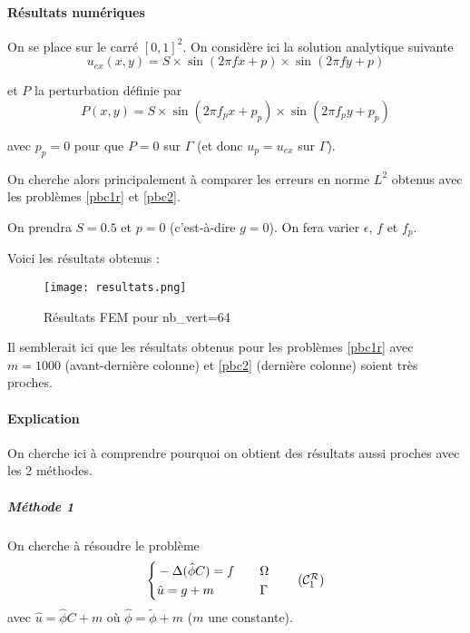 \paragraph{Résultats numériques \\} 

On se place sur le carré $[0,1]^2$. On considère ici la solution analytique suivante
$$u_{ex}(x,y) = S\times\sin(2\pi fx + p)\times\sin(2\pi fy + p)$$ 

et $P$ la perturbation définie par
$$P(x,y)=S\times\sin(2\pi f_px + p_p)\times\sin(2\pi f_py + p_p)$$

avec $p_p=0$ pour que $P=0$ sur $\Gamma$ (et donc $u_p=u_{ex}$ sur $\Gamma$). 

On cherche alors principalement à comparer les erreurs en norme $L^2$ obtenus avec les problèmes \ref{pbc1r} et \ref{pbc2}.

On prendra $S=0.5$ et $p=0$ (c'est-à-dire $g=0$). On fera varier $\epsilon$, $f$ et $f_p$. 

Voici les résultats obtenus :

\begin{minipage}{\linewidth}
	\begin{figure}[H]
		\centering
		\texttt{[image: resultats.png]}
		\caption{Résultats FEM pour nb\_vert=64}
	\end{figure}
\end{minipage}

Il semblerait ici que les résultats obtenus pour les problèmes \ref{pbc1r} avec $m=1000$ (avant-dernière colonne) et \ref{pbc2} (dernière colonne) soient très proches.

\paragraph{Explication \\}

On cherche ici à comprendre pourquoi on obtient des résultats aussi proches avec les 2 méthodes.

\subparagraph*{Méthode 1 \\}

On cherche à résoudre le problème
\begin{equation}
	\left\{\begin{aligned}
		&-\Delta (\hat{\phi}C)=f \quad &&\Omega \\
		&\hat{u}=g+m \quad &&\Gamma
	\end{aligned}\right. \tag{$\mathcal{C}_1^\mathcal{R}$}
\end{equation}
avec $\hat{u}=\hat{\phi}C+m$ où $\hat{\phi}=\tilde{\phi}+m$ ($m$ une constante).

